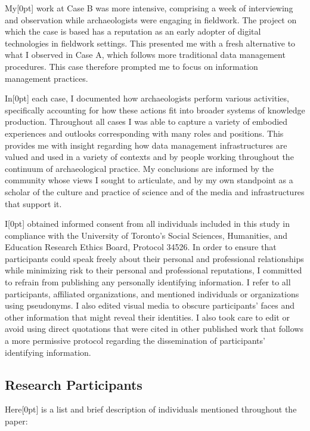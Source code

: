 \documentclass[
]{article}
\newcommand{\paragraphnumber}[1]{\marginnote{\color{lightgray}\tiny{#1}}[0pt]}
\begin{document}
My\paragraphnumber{[89]} work at Case B was more intensive, comprising a
week of interviewing and observation while archaeologists were engaging
in fieldwork. The project on which the case is based has a reputation as
an early adopter of digital technologies in fieldwork settings. This
presented me with a fresh alternative to what I observed in Case A,
which follows more traditional data management procedures. This case
therefore prompted me to focus on information management practices.

In\paragraphnumber{[90]} each case, I documented how archaeologists
perform various activities, specifically accounting for how these
actions fit into broader systems of knowledge production. Throughout all
cases I was able to capture a variety of embodied experiences and
outlooks corresponding with many roles and positions. This provides me
with insight regarding how data management infrastructures are valued
and used in a variety of contexts and by people working throughout the
continuum of archaeological practice. My conclusions are informed by the
community whose views I sought to articulate, and by my own standpoint
as a scholar of the culture and practice of science and of the media and
infrastructures that support it.

I\paragraphnumber{[91]} obtained informed consent from all individuals
included in this study in compliance with the University of Toronto's
Social Sciences, Humanities, and Education Research Ethics Board,
Protocol 34526. In order to ensure that participants could speak freely
about their personal and professional relationships while minimizing
risk to their personal and professional reputations, I committed to
refrain from publishing any personally identifying information. I refer
to all participants, affiliated organizations, and mentioned individuals
or organizations using pseudonyms. I also edited visual media to obscure
participants' faces and other information that might reveal their
identities. I also took care to edit or avoid using direct quotations
that were cited in other published work that follows a more permissive
protocol regarding the dissemination of participants' identifying
information.

\subsection{Research Participants}\label{research-participants}

Here\paragraphnumber{[92]} is a list and brief description of
individuals mentioned throughout the paper:
\end{document}
